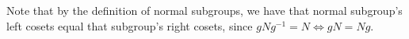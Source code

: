 Note that by the definition of normal subgroups, we have that normal subgroup's left
cosets equal that subgroup's right cosets, since $gNg^{-1}=N\iff gN=Ng$.







